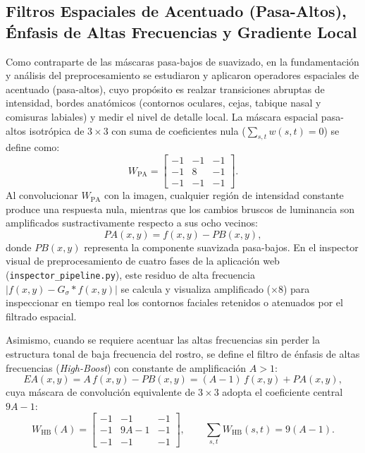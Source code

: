 \documentclass{article}
\begin{document}
\subsection{Filtros Espaciales de Acentuado (Pasa-Altos), Énfasis de Altas Frecuencias y Gradiente Local}
Como contraparte de las máscaras pasa-bajos de suavizado, en la fundamentación y análisis del preprocesamiento se estudiaron y aplicaron operadores espaciales de acentuado (pasa-altos), cuyo propósito es realzar transiciones abruptas de intensidad, bordes anatómicos (contornos oculares, cejas, tabique nasal y comisuras labiales) y medir el nivel de detalle local. La máscara espacial pasa-altos isotrópica de $3 \times 3$ con suma de coeficientes nula ($\sum_{s,t} w(s,t) = 0$) se define como:
\begin{equation}
W_{\text{PA}} = \begin{bmatrix} -1 & -1 & -1 \\ -1 & 8 & -1 \\ -1 & -1 & -1 \end{bmatrix}.
\label{eq:mascara_pa}
\end{equation}
Al convolucionar $W_{\text{PA}}$ con la imagen, cualquier región de intensidad constante produce una respuesta nula, mientras que los cambios bruscos de luminancia son amplificados sustractivamente respecto a sus ocho vecinos:
\begin{equation}
PA(x,y) = f(x,y) - PB(x,y),
\label{eq:sustraccion_pa}
\end{equation}
donde $PB(x,y)$ representa la componente suavizada pasa-bajos. En el inspector visual de preprocesamiento de cuatro fases de la aplicación web (\texttt{inspector\_pipeline.py}), este residuo de alta frecuencia $|f(x,y) - G_{\sigma}*f(x,y)|$ se calcula y visualiza amplificado ($\times 8$) para inspeccionar en tiempo real los contornos faciales retenidos o atenuados por el filtrado espacial.

Asimismo, cuando se requiere acentuar las altas frecuencias sin perder la estructura tonal de baja frecuencia del rostro, se define el filtro de énfasis de altas frecuencias (\textit{High-Boost}) con constante de amplificación $A > 1$:
\begin{equation}
EA(x,y) = A\,f(x,y) - PB(x,y) = (A - 1)\,f(x,y) + PA(x,y),
\label{eq:high_boost}
\end{equation}
cuya máscara de convolución equivalente de $3 \times 3$ adopta el coeficiente central $9A - 1$:
\begin{equation}
W_{\text{HB}}(A) = \begin{bmatrix} -1 & -1 & -1 \\ -1 & 9A - 1 & -1 \\ -1 & -1 & -1 \end{bmatrix}, \qquad \sum_{s,t} W_{\text{HB}}(s,t) = 9(A - 1).
\label{eq:mascara_high_boost}
\end{equation}
\end{document}
